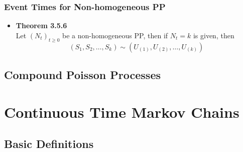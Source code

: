 \documentclass[11pt,a4paper]{article}
\begin{document}
\subsubsection{Event Times for Non-homogeneous PP}
\begin{itemize}
    \item \textbf{Theorem 3.5.6} \\
        Let ${(N_t)}_{t \geq 0}$ be a non-homogeneous PP, then if $N_t = k$ is given, then
        \[
            (S_1, S_2, \ldots, S_k) \sim (U_{(1)}, U_{(2)}, \ldots, U_{(k)})
        \]
\end{itemize}

\subsection{Compound Poisson Processes}

\section{Continuous Time Markov Chains}
\subsection{Basic Definitions}
\end{document}
